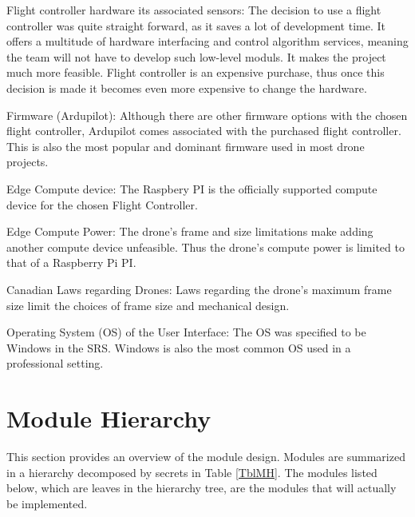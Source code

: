 \documentclass[12pt, titlepage]{article}
\begin{document}
\begin{description}
\item[UC1 \label{UC_1}:] 	Flight controller hardware its associated sensors: The decision to use a flight controller was quite straight forward, as it saves a lot of development time. It offers a multitude of hardware interfacing and control algorithm services, meaning the team will not have to develop such low-level moduls. It makes the project much more feasible. Flight controller is an expensive purchase, thus once this decision is made it becomes even more expensive to change the hardware.
\item[UC2 \label{UC_2}:] 		Firmware (Ardupilot): Although there are other firmware options with the chosen flight controller, Ardupilot comes associated with the purchased flight controller. This is also the most popular and dominant firmware used in most drone projects.

\item[UC3 \label{UC_3}:] 		Edge Compute device: The Raspbery PI is the officially supported compute device for the chosen Flight Controller.  

\item[UC4 \label{UC_4}:] 
Edge Compute Power: The drone's frame and size limitations make adding another compute device unfeasible. Thus the drone's  compute power is limited to that of a Raspberry Pi PI.

\item[UC5 \label{UC_5}:] 
Canadian Laws regarding Drones: Laws regarding the drone's maximum frame size limit the choices of frame size and mechanical design.

\item[UC6 \label{UC_6}:] 
Operating System (OS) of the User Interface: The OS was specified to be Windows in the SRS. Windows is also the most common OS used in a professional setting.
\item 
\end{description}

\section{Module Hierarchy} \label{SecMH}

This section provides an overview of the module design. Modules are summarized
in a hierarchy decomposed by secrets in Table \ref{TblMH}. The modules listed
below, which are leaves in the hierarchy tree, are the modules that will
actually be implemented.
\end{document}
